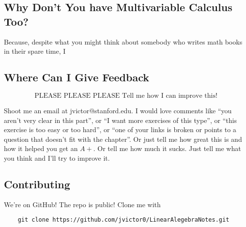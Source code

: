 \subsection*{Why Don't You have Multivariable Calculus Too?}

Because, despite what you might think about somebody who writes math books in their spare time, I 

\subsection*{Where Can I Give Feedback}

\[\mbox{PLEASE PLEASE PLEASE Tell me how I can improve this!}\]

Shoot me an email at jvictor@stanford.edu.  
I would love comments like ``you aren't very clear in this part'', or ``I want more exercises of this type'', or ``this exercise is too easy or too hard'', 
or ``one of your links is broken or points to a question that doesn't fit with the chapter''.
Or just tell me how great this is and how it helped you get an $A+$.  
Or tell me how much it sucks.  
Just tell me what you think and I'll try to improve it.


\subsection*{Contributing}

We're on GitHub!
The repo is public!  
Clone me with
\begin{verbatim}
    git clone https://github.com/jvictor0/LinearAlegebraNotes.git
\end{verbatim}

